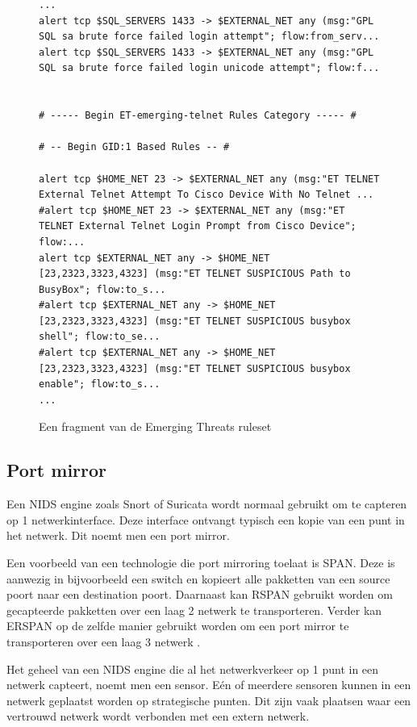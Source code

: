 \documentclass[a4paper,12pt]{report}
\begin{document}
\begin{figure}[H]
  \begin{lstlisting}[basicstyle=\ttfamily\scriptsize]
...
alert tcp $SQL_SERVERS 1433 -> $EXTERNAL_NET any (msg:"GPL SQL sa brute force failed login attempt"; flow:from_serv...
alert tcp $SQL_SERVERS 1433 -> $EXTERNAL_NET any (msg:"GPL SQL sa brute force failed login unicode attempt"; flow:f...


# ----- Begin ET-emerging-telnet Rules Category ----- #

# -- Begin GID:1 Based Rules -- #

alert tcp $HOME_NET 23 -> $EXTERNAL_NET any (msg:"ET TELNET External Telnet Attempt To Cisco Device With No Telnet ...
#alert tcp $HOME_NET 23 -> $EXTERNAL_NET any (msg:"ET TELNET External Telnet Login Prompt from Cisco Device"; flow:...
alert tcp $EXTERNAL_NET any -> $HOME_NET [23,2323,3323,4323] (msg:"ET TELNET SUSPICIOUS Path to BusyBox"; flow:to_s...
#alert tcp $EXTERNAL_NET any -> $HOME_NET [23,2323,3323,4323] (msg:"ET TELNET SUSPICIOUS busybox shell"; flow:to_se...
#alert tcp $EXTERNAL_NET any -> $HOME_NET [23,2323,3323,4323] (msg:"ET TELNET SUSPICIOUS busybox enable"; flow:to_s...
...
  \end{lstlisting}
  \caption{Een fragment van de Emerging Threats ruleset}
  \label{fig:et-voorbeeld}
\end{figure}

\subsection{Port mirror}
Een NIDS engine zoals Snort of Suricata wordt normaal gebruikt om te capteren op 1 netwerkinterface.
Deze interface ontvangt typisch een kopie van een punt in het netwerk.
Dit noemt men een port mirror.

Een voorbeeld van een technologie die port mirroring toelaat is SPAN.
Deze is aanwezig in bijvoorbeeld een switch en kopieert alle pakketten van een source poort naar een destination poort.
Daarnaast kan RSPAN gebruikt worden om gecapteerde pakketten over een laag 2 netwerk te transporteren.
Verder kan ERSPAN op de zelfde manier gebruikt worden om een port mirror te transporteren over een laag 3 netwerk \autocite{cisco:span}.

Het geheel van een NIDS engine die al het netwerkverkeer op 1 punt in een netwerk capteert, noemt men een sensor.
Eén of meerdere sensoren kunnen in een netwerk geplaatst worden op strategische punten.
Dit zijn vaak plaatsen waar een vertrouwd netwerk wordt verbonden met een extern netwerk.
\end{document}
